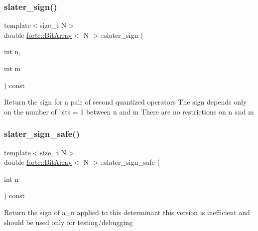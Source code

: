 \subsubsection{\texorpdfstring{slater\+\_\+sign()}{slater\_sign()}\hspace{0.1cm}{\footnotesize\ttfamily [2/2]}}
{\footnotesize\ttfamily template$<$size\+\_\+t N$>$ \\
double \mbox{\hyperlink{classforte_1_1_bit_array}{forte\+::\+Bit\+Array}}$<$ N $>$\+::slater\+\_\+sign (\begin{DoxyParamCaption}\item[{int}]{n,  }\item[{int}]{m }\end{DoxyParamCaption}) const\hspace{0.3cm}{\ttfamily [inline]}}

Return the sign for a pair of second quantized operators The sign depends only on the number of bits = 1 between n and m There are no restrictions on n and m \mbox{\label{classforte_1_1_bit_array_a0bb468ffa1f6aa5e95458ee63be391e9}} 
\subsubsection{\texorpdfstring{slater\+\_\+sign\+\_\+safe()}{slater\_sign\_safe()}}
{\footnotesize\ttfamily template$<$size\+\_\+t N$>$ \\
double \mbox{\hyperlink{classforte_1_1_bit_array}{forte\+::\+Bit\+Array}}$<$ N $>$\+::slater\+\_\+sign\+\_\+safe (\begin{DoxyParamCaption}\item[{int}]{n }\end{DoxyParamCaption}) const\hspace{0.3cm}{\ttfamily [inline]}}

Return the sign of a\+\_\+n applied to this determinant this version is inefficient and should be used only for testing/debugging \mbox{\label{classforte_1_1_bit_array_a10682d9d2a6a947f9a001af6bc3239d7}} 
